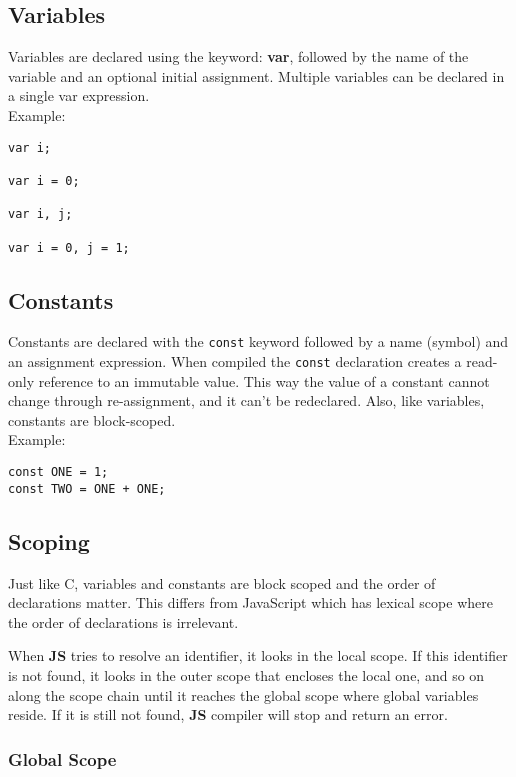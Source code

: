 \subsection {Variables}

Variables are declared using the keyword: \textbf{var}, followed by the name of the variable and an optional initial assignment. Multiple variables can be declared in a single var expression.\\

Example:
\begin{lstlisting}[language=uJS]
var i;

var i = 0;

var i, j;

var i = 0, j = 1;
\end{lstlisting}

\subsection {Constants} 

Constants are declared with the \texttt{const} keyword followed by a name (symbol) and an assignment expression. When compiled the \texttt{const} declaration creates a read-only reference to an immutable value. This way the value of a constant cannot change through re-assignment, and it can't be redeclared. Also, like variables, constants are block-scoped. \\

Example:
\begin{lstlisting}[language=uJS]
const ONE = 1;
const TWO = ONE + ONE;
\end{lstlisting}

\subsection{Scoping}

Just like C, variables and constants are block scoped and the order of declarations matter. This differs from JavaScript which has lexical scope where the order of declarations is irrelevant.

When \textbf{\textmu JS} tries to resolve an identifier, it looks in the local scope. If this identifier is not found, it looks in the outer scope that encloses the local one, and so on along the scope chain until it reaches the global scope where global variables reside. If it is still not found, \textbf{\textmu JS} compiler will stop and return an error.

\subsubsection {Global Scope}

